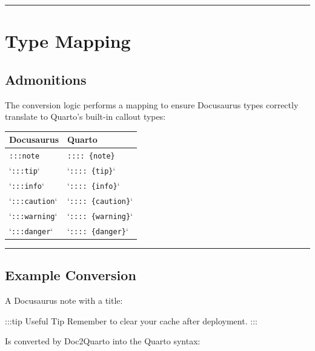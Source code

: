 \documentclass[
  letterpaper,
  DIV=11,
  numbers=noendperiod]{scrreprt}
\newenvironment{Shaded}{\begin{snugshade}}{\end{snugshade}}
\newcommand{\NormalTok}[1]{\textcolor[rgb]{0.00,0.23,0.31}{#1}}
\begin{document}
\begin{center}\rule{0.5\linewidth}{0.5pt}\end{center}

\chapter{Type Mapping}\label{type-mapping}

\section{Admonitions}\label{admonitions-1}

The conversion logic performs a mapping to ensure Docusaurus types
correctly translate to Quarto's built-in callout types:

\begin{longtable}[]{@{}ll@{}}
\toprule\noalign{}
Docusaurus & Quarto \\
\midrule\noalign{}
\endhead
\bottomrule\noalign{}
\endlastfoot
\texttt{:::note} & \texttt{::::\ \{note\}} \\
`\texttt{:::tip}` & `\texttt{::::\ \{tip\}}` \\
`\texttt{:::info}` & `\texttt{::::\ \{info\}}` \\
`\texttt{:::caution}` & `\texttt{::::\ \{caution\}}` \\
`\texttt{:::warning}` & `\texttt{::::\ \{warning\}}` \\
`\texttt{:::danger}` & `\texttt{::::\ \{danger\}}` \\
\end{longtable}

\begin{center}\rule{0.5\linewidth}{0.5pt}\end{center}

\section{Example Conversion}\label{example-conversion}

A Docusaurus note with a title:

\begin{Shaded}
\begin{Highlighting}[]
\NormalTok{:::tip Useful Tip Remember to clear your cache after deployment.}
\NormalTok{:::}
\end{Highlighting}
\end{Shaded}

Is converted by Doc2Quarto into the Quarto syntax:
\end{document}
